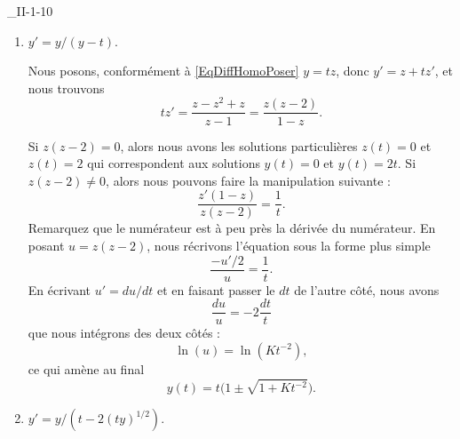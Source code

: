 

\begin{corrige}{_II-1-10}

\begin{enumerate}

\item 
$y'=y/(y-t)$.

Nous posons, conformément à \eqref{EqDiffHomoPoser} $y=tz$, donc $y'=z+tz'$, et nous trouvons
\begin{equation}
	tz'=\frac{ z-z^2+z }{ z-1 }=\frac{ z(z-2) }{ 1-z }.
\end{equation}

Si $z(z-2)=0$, alors nous avons les solutions particulières $z(t)=0$ et $z(t)=2$ qui correspondent aux solutions $y(t)=0$ et $y(t)=2t$. Si $z(z-2)\neq 0$, alors nous pouvons faire la manipulation suivante :
\begin{equation}
	\frac{ z'(1-z) }{ z(z-2) }=\frac{1}{ t }.
\end{equation}
Remarquez que le numérateur est à peu près la dérivée du numérateur. En posant $u=z(z-2)$, nous récrivons l'équation sous la forme plus simple
\begin{equation}
	\frac{ -u'/2 }{ u }=\frac{1}{ t }.
\end{equation}
En écrivant $u'=du/dt$ et en faisant passer le $dt$ de l'autre côté, nous avons
\begin{equation}
	\frac{ du }{ u }=-2\frac{ dt }{ t } 
\end{equation}
que nous intégrons des deux côtés :
\begin{equation}
	\ln(u)=\ln(Kt^{-2}),
\end{equation}
ce qui amène au final
\begin{equation}
	y(t)=t\big( 1\pm\sqrt{1+Kt^{-2}} \big).
\end{equation}

\item
$y'=y/(t-2(ty)^{1/2})$.


\end{enumerate}
\end{corrige}

